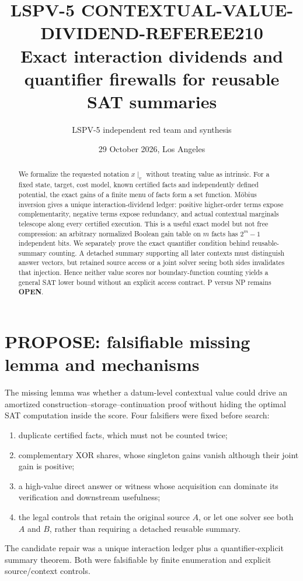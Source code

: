 \documentclass[11pt]{article}
\title{LSPV-5 CONTEXTUAL-VALUE-DIVIDEND-REFEREE210\\
Exact interaction dividends and quantifier firewalls for reusable SAT summaries}
\author{LSPV-5 independent red team and synthesis}
\date{29 October 2026, Los Angeles}
\begin{document}
\maketitle

\begin{abstract}
We formalize the requested notation $x\mid_v$ without treating value as intrinsic.
For a fixed state, target, cost model, known certified facts and independently
defined potential, the exact gains of a finite menu of facts form a set
function.  M\"obius inversion gives a unique interaction-dividend ledger:
positive higher-order terms expose complementarity, negative terms expose
redundancy, and actual contextual marginals telescope along every certified
execution.  This is a useful exact model but not free compression: an arbitrary
normalized Boolean gain table on $m$ facts has $2^m-1$ independent bits.
We separately prove the exact quantifier condition behind reusable-summary
counting.  A detached summary supporting all later contexts must distinguish
answer vectors, but retained source access or a joint solver seeing both sides
invalidates that injection.  Hence neither value scores nor boundary-function
counting yields a general SAT lower bound without an explicit access contract.
P versus NP remains \textbf{OPEN}.
\end{abstract}

\section{PROPOSE: falsifiable missing lemma and mechanisms}
The missing lemma was whether a datum-level contextual value could drive an
amortized construction--storage--continuation proof without hiding the optimal
SAT computation inside the score.  Four falsifiers were fixed before search:
\begin{enumerate}
  \item duplicate certified facts, which must not be counted twice;
  \item complementary XOR shares, whose singleton gains vanish although their
  joint gain is positive;
  \item a high-value direct answer or witness whose acquisition can dominate
  its verification and downstream usefulness;
  \item the legal controls that retain the original source $A$, or let one
  solver see both $A$ and $B$, rather than requiring a detached reusable summary.
\end{enumerate}
The candidate repair was a unique interaction ledger plus a quantifier-explicit
summary theorem.  Both were falsifiable by finite enumeration and explicit
source/context controls.
\end{document}
